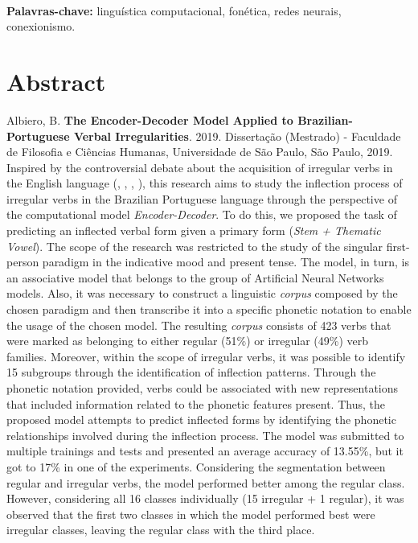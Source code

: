 \documentclass[12pt,twoside,a4paper]{book}
\begin{document}
\\
 \textbf{Palavras-chave:}
linguística computacional, fonética, redes neurais, conexionismo.

\chapter*{Abstract}

\noindent Albiero, B. \textbf{The Encoder-Decoder Model Applied to Brazilian-Portuguese Verbal Irregularities}. 
2019.
Dissertação (Mestrado) - Faculdade de Filosofia e Ciências Humanas,
Universidade de São Paulo, São Paulo, 2019.
\\

Inspired by the controversial debate about the acquisition of irregular verbs in the English language (\cite{chomsky:1968}, \cite{Pinker:1988},
\cite{Albright2003RulesVA}, \cite{kirov:2018}), this research aims to study the inflection process of irregular verbs in the Brazilian Portuguese language through the perspective of the computational model \textit{Encoder-Decoder}. To do this, we proposed the task of predicting an inflected verbal form given a primary form (\textit{Stem + Thematic Vowel}). The scope of the research was restricted to the study of the singular first-person paradigm in the indicative mood and present tense. The model, in turn, is an associative model that belongs to the group of Artificial Neural Networks models. Also, it was necessary to construct a linguistic \textit{corpus} composed by the chosen paradigm and then transcribe it into a specific phonetic notation to enable the usage of the chosen model. The resulting \textit{corpus} consists of 423 verbs that were marked as belonging to either regular (51\%) or irregular (49\%) verb families. Moreover, within the scope of irregular verbs, it was possible to identify 15 subgroups through the identification of inflection patterns. Through the phonetic notation provided, verbs could be associated with new representations that included information related to the phonetic features present. Thus, the proposed model attempts to predict inflected forms by identifying the phonetic relationships involved during the inflection process. The model was submitted to multiple trainings and tests and presented an average accuracy of 13.55\%, but it got to 17\% in one of the experiments. Considering the segmentation between regular and irregular verbs, the model performed better among the regular class. However, considering all 16 classes individually (15 irregular + 1 regular), it was observed that the first two classes in which the model performed best were irregular classes, leaving the regular class with the third place.
\end{document}
